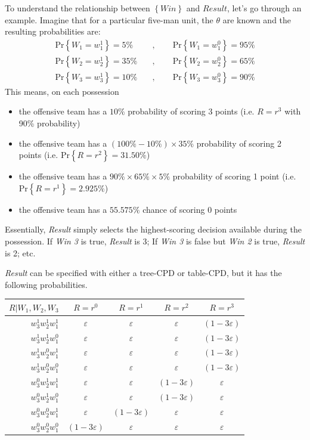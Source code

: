 \documentclass[10pt,twocolumn]{article}
\newcommand{\prb}[1]{\ensuremath{  \mathrm{Pr}\left\{ #1 \right\}  }}
\begin{document}
To understand the relationship between $\left\{Win\right\}$ and $Result$, let's go through an example.
Imagine that for a particular five-man unit, the $\theta$ are known and the resulting probabilities are:
\begin{align*}
\prb{W_1=w_1^1} = 5\% \quad&, \quad\quad \prb{W_1=w_1^0} = 95\%
\\
\prb{W_2=w_2^1} = 35\% \quad&, \quad\quad \prb{W_2=w_2^0} = 65\%
\\
\prb{W_3=w_3^1} = 10\% \quad&, \quad\quad \prb{W_3=w_3^0} = 90\%
\end{align*}%
This means, on each possession
\begin{itemize}
\item the offensive team has a $10\%$ probability of scoring 3 points (i.e. $R=r^3$ with 90\% probability)
\item the offensive team has a $\left(100\% - 10\%\right) \times 35\%$ probability of scoring 2 points (i.e. $\prb{R=r^2}=31.50\%$)
\item the offensive team has a $90\% \times 65\% \times 5\%$ probability of scoring 1 point (i.e. $\prb{R=r^1}=2.925\%$)
\item the offensive team has a $55.575\%$ chance of scoring 0 points
\end{itemize}

Essentially, \emph{Result} simply selects the highest-scoring decision available during the possession.
If \emph{Win 3} is true, \emph{Result} is 3; If \emph{Win 3} is false but \emph{Win 2} is true, \emph{Result} is 2; etc.

\emph{Result} can be specified with either a tree-CPD or table-CPD, but it has the following probabilities.

\begin{tabular}{ r|c c c c|}
$R|W_1,W_2,W_3$ & $R=r^0$ & $R=r^1$ & $R=r^2$ & $R=r^3$ \\  \hline
$w^1_3 w^1_2 w^1_1$ & $\varepsilon$ &  $\varepsilon$ &  $\varepsilon$ & $(1 - 3 \varepsilon)$ \\ \hline
$w^1_3 w^1_2 w^0_1$ & $\varepsilon$ &  $\varepsilon$ &  $\varepsilon$ & $(1 - 3 \varepsilon)$ \\ \hline
$w^1_3 w^0_2 w^1_1$ & $\varepsilon$ &  $\varepsilon$ &  $\varepsilon$ & $(1 - 3 \varepsilon)$ \\ \hline
$w^1_3 w^0_2 w^0_1$ & $\varepsilon$ &  $\varepsilon$ &  $\varepsilon$ & $(1 - 3 \varepsilon)$ \\ \hline
$w^0_3 w^1_2 w^1_1$ & $\varepsilon$ &  $\varepsilon$ &  $(1 - 3 \varepsilon)$ & $\varepsilon$ \\ \hline
$w^0_3 w^1_2 w^0_1$ & $\varepsilon$ &  $\varepsilon$ &  $(1 - 3 \varepsilon)$ & $\varepsilon$ \\ \hline
$w^0_3 w^0_2 w^1_1$ & $\varepsilon$ & $(1 - 3 \varepsilon)$   & $\varepsilon$ & $\varepsilon$ \\ \hline
$w^0_3 w^0_2 w^0_1$ & $(1 - 3 \varepsilon)$ & $\varepsilon$   & $\varepsilon$ & $\varepsilon$ \\ \hline
\end{tabular}
\end{document}
